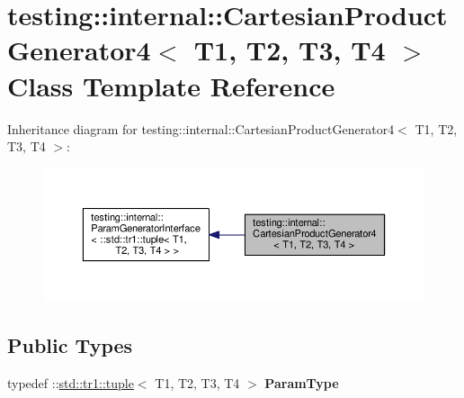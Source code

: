 \hypertarget{classtesting_1_1internal_1_1_cartesian_product_generator4}{}\section{testing\+:\+:internal\+:\+:Cartesian\+Product\+Generator4$<$ T1, T2, T3, T4 $>$ Class Template Reference}
\label{classtesting_1_1internal_1_1_cartesian_product_generator4}


Inheritance diagram for testing\+:\+:internal\+:\+:Cartesian\+Product\+Generator4$<$ T1, T2, T3, T4 $>$\+:
\nopagebreak
\begin{figure}[H]
\begin{center}
\leavevmode
\includegraphics[width=350pt]{classtesting_1_1internal_1_1_cartesian_product_generator4__inherit__graph}
\end{center}
\end{figure}
\subsection*{Public Types}
\begin{DoxyCompactItemize}
\item 
\mbox{\label{classtesting_1_1internal_1_1_cartesian_product_generator4_ac8cc31e9f7b2d0b7ee725a60f82edb78}} 
typedef \+::\mbox{\hyperlink{classstd_1_1tr1_1_1tuple}{std\+::tr1\+::tuple}}$<$ T1, T2, T3, T4 $>$ {\bfseries Param\+Type}
\end{DoxyCompactItemize}
